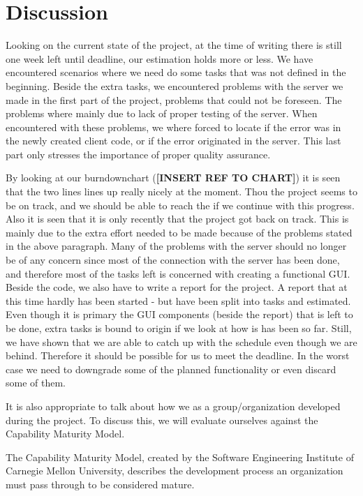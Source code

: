 \section{Discussion}
Looking on the current state of the project, at the time of writing there is still one week left until deadline, our estimation holds more or less. We have encountered scenarios where we need do some tasks that was not defined in the beginning. Beside the extra tasks, we encountered problems with the server we made in the first part of the project, problems that could not be foreseen. The problems where mainly due to lack of proper testing of the server. When encountered with these problems, we where forced to locate if the error was in the newly created client code, or if the error originated in the server. This last part only stresses the importance of proper quality assurance.

By looking at our burndownchart (\textbf{[INSERT REF TO CHART]}) it is seen that the two lines lines up really nicely at the moment. Thou the project seems to be on track, and we should be able to reach the if we continue with this progress. Also it is seen that it is only recently that the project got back on track. This is mainly due to the extra effort needed to be made because of the problems stated in the above paragraph. Many of the problems with the server should no longer be of any concern since most of the connection with the server has been done, and therefore most of the tasks left is concerned with creating a functional GUI. \\
Beside the code, we also have to write a report for the project. A report that at this time hardly has been started - but have been split into tasks and estimated.
Even though it is primary the GUI components (beside the report) that is left to be done, extra tasks is bound to origin if we look at how is has been so far. Still, we have shown that we are able to catch up with the schedule even though we are behind. Therefore it should be possible for us to meet the deadline. In the worst case we need to downgrade some of the planned functionality or even discard some of them.

It is also appropriate to talk about how we as a group/organization developed during the project. To discuss this, we will evaluate ourselves against the Capability Maturity Model.

The Capability Maturity Model, created by the Software Engineering Institute of Carnegie Mellon University, describes the development process an organization must pass through to be considered mature.

